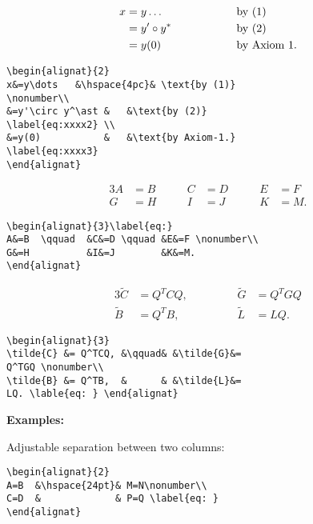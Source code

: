 \documentclass[journal]{IEEEtran}
\begin{document}
\begin{alignat}{2}
x&=y\dots         &\hspace{4pc}& \text{by (1)} \nonumber\\
&=y'\circ y^\ast &            & \text{by (2)}        \label{eq:xxxx2} \\
&=y(0)           &            & \text {by Axiom 1.}  \label{eq:xxxx3}
\end{alignat}

\begin{verbatim}
\begin{alignat}{2}
x&=y\dots   &\hspace{4pc}& \text{by (1)}
\nonumber\\
&=y'\circ y^\ast &   &\text{by (2)}
\label{eq:xxxx2} \\
&=y(0)           &   &\text{by Axiom-1.}
\label{eq:xxxx3}
\end{alignat}
\end{verbatim}

\begin{alignat}{3}
A&=B  \qquad  &C&=D \qquad &E&=F \nonumber\\
G&=H          &I&=J        &K&=M.
\end{alignat}


\begin{verbatim}
\begin{alignat}{3}\label{eq:}
A&=B  \qquad  &C&=D \qquad &E&=F \nonumber\\
G&=H          &I&=J        &K&=M.
\end{alignat}
\end{verbatim}

\begin{alignat}{3}
\tilde{C} &= Q^TCQ,  &\qquad&  &\tilde{G}&=Q^TGQ \nonumber\\
\tilde{B} &= Q^TB,   &      &  &\tilde{L}&=LQ.
\end{alignat}

\begin{verbatim}
\begin{alignat}{3}
\tilde{C} &= Q^TCQ, &\qquad& &\tilde{G}&=
Q^TGQ \nonumber\\
\tilde{B} &= Q^TB,  &      & &\tilde{L}&=
LQ. \lable{eq: } \end{alignat}
\end{verbatim}

\noindent \textbf{Examples:}\par
\noindent Adjustable separation between two columns:
\begin{verbatim}
\begin{alignat}{2}
A=B  &\hspace{24pt}& M=N\nonumber\\
C=D  &             & P=Q \label{eq: }
\end{alignat}
\end{verbatim}
\end{document}
